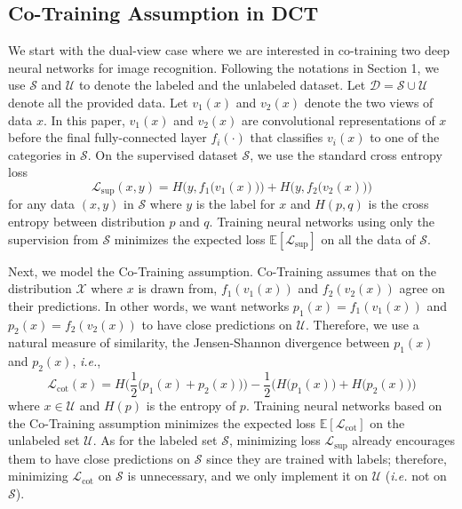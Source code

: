 \documentclass[runningheads]{llncs}
\begin{document}
\vspace{-0.08in}\subsection{Co-Training Assumption in DCT}
We start with the dual-view case where we are interested in co-training two deep neural networks for image recognition.
Following the notations in Section 1, we use $\mathcal{S}$ and $\mathcal{U}$ to denote the labeled and the unlabeled dataset.
Let $\mathcal{D}=\mathcal{S}\cup\mathcal{U}$ denote all the provided data.
Let $v_1(x)$ and $v_2(x)$ denote the two views of data $x$.
In this paper, $v_1(x)$ and $v_2(x)$ are convolutional representations of $x$ before the final fully-connected layer $f_i(\cdot)$ that classifies $v_i(x)$ to one of the categories in $\mathcal{S}$.
On the supervised dataset $\mathcal{S}$, we use the standard cross entropy loss
\begin{equation}\label{eq:sup}
  \mathcal{L}_{\text{sup}}(x, y) = H\Big(y, f_1\big(v_1(x)\big)\Big) + H\Big(y, f_2\big(v_2(x)\big)\Big)
\end{equation}
for any data $(x, y)$ in $\mathcal{S}$ where $y$ is the label for $x$ and $H(p, q)$ is the cross entropy between distribution $p$ and $q$.
Training neural networks using only the supervision from $\mathcal{S}$ minimizes the expected loss $\mathbb{E}[\mathcal{L}_{\text{sup}}]$ on all the data of $\mathcal{S}$.

Next, we model the Co-Training assumption.
Co-Training assumes that on the distribution $\mathcal{X}$ where $x$ is drawn from, $f_1(v_1(x))$ and $f_2(v_2(x))$ agree on their predictions.
In other words, we want networks $p_1(x) = f_1(v_1(x))$ and $p_2(x) = f_2(v_2(x))$ to have close predictions on $\mathcal{U}$.
Therefore, we use a natural measure of similarity, the Jensen-Shannon divergence between $p_1(x)$ and $p_2(x)$, \textit{i.e.},
\begin{equation}\label{eq:cot}
  \mathcal{L}_{\text{cot}}(x)
  = H\Big(\dfrac{1}{2}\big(p_1(x) + p_2(x)\big)\Big) - \dfrac{1}{2}\Big(H\big(p_1(x) \big) + H\big(p_2(x)\big)\Big)
\end{equation}
where $x\in\mathcal{U}$ and $H(p)$ is the entropy of $p$.
Training neural networks based on the Co-Training assumption minimizes the expected loss $\mathbb{E}[\mathcal{L}_{\text{cot}}]$ on the unlabeled set $\mathcal{U}$.
As for the labeled set $\mathcal{S}$, minimizing loss $\mathcal{L}_{\text{sup}}$ already encourages them to have close predictions on $\mathcal{S}$ since they are trained with labels; therefore, minimizing $\mathcal{L}_{\text{cot}}$ on $\mathcal{S}$ is unnecessary, and we only implement it on $\mathcal{U}$ (\textit{i.e.} not on $\mathcal{S}$).
\end{document}
